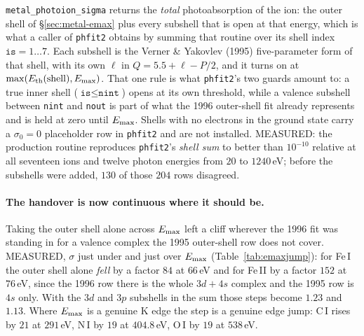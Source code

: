 \documentclass[english,a4paper]{my_memo}
\begin{document}
\texttt{metal\_photoion\_sigma} returns the \emph{total} photoabsorption of
the ion: the outer shell of \S\ref{sec:metal-emax} plus every subshell that
is open at that energy, which is what a caller of \texttt{phfit2} obtains by
summing that routine over its shell index $\texttt{is}=1\ldots7$. Each
subshell is the Verner \& Yakovlev (1995) five-parameter form of that shell,
with its own $\ell$ in $Q = 5.5 + \ell - P/2$, and it turns on at
$\max(E_{\rm th}({\rm shell}), E_{\rm max})$. That one rule is what
\texttt{phfit2}'s two guards amount to: a true inner shell
($\texttt{is} \le \texttt{nint}$) opens at its own threshold, while a
valence subshell between \texttt{nint} and \texttt{nout} is part of what the
1996 outer-shell fit already represents and is held at zero until
$E_{\rm max}$. Shells with no electrons in the ground state carry a
$\sigma_0 = 0$ placeholder row in \texttt{phfit2} and are not installed.
MEASURED: the production routine reproduces \texttt{phfit2}'s \emph{shell
sum} to better than $10^{-10}$ relative at all seventeen ions and twelve
photon energies from $20$ to $1240\,$eV; before the subshells were added,
$130$ of those $204$ rows disagreed.

\paragraph{The handover is now continuous where it should be.} Taking the
outer shell alone across $E_{\rm max}$ left a cliff wherever the 1996 fit
was standing in for a valence complex the 1995 outer-shell row does not
cover. MEASURED, $\sigma$ just under and just over $E_{\rm max}$
(Table~\ref{tab:emaxjump}): for Fe\,I the outer shell alone \emph{fell} by a
factor $84$ at $66\,$eV and for Fe\,II by a factor $152$ at $76\,$eV, since
the 1996 row there is the whole $3d+4s$ complex and the 1995 row is $4s$
only. With the $3d$ and $3p$ subshells in the sum those steps become $1.23$
and $1.13$. Where $E_{\rm max}$ is a genuine K edge the step is a genuine
edge jump: C\,I rises by $21$ at $291\,$eV, N\,I by $19$ at $404.8\,$eV,
O\,I by $19$ at $538\,$eV.
\end{document}
